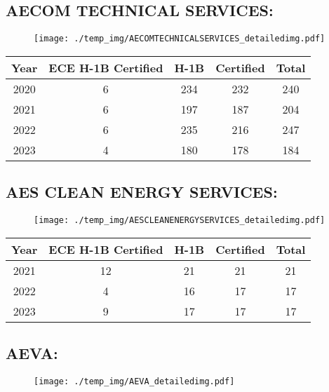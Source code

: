 \documentclass{article}%
\begin{document}
%
\newpage%
\subsection{AECOM TECHNICAL SERVICES:}%
\label{subsec:AECOMTECHNICALSERVICES}%
\label{AECOMTECHNICALSERVICESdetailed}%


\begin{figure}[htbp]%
\centering%
\texttt{[image: ./temp\_img/AECOMTECHNICALSERVICES\_detailedimg.pdf]}%
\end{figure}

%
\begin{longtable}{c|c|c|c|c}%
\hline%
Year&ECE H{-}1B Certified&H{-}1B&Certified&Total\\%
\hline%
2020&6&234&232&240\\%
\hline%
2021&6&197&187&204\\%
\hline%
2022&6&235&216&247\\%
\hline%
2023&4&180&178&184\\%
\hline%
\end{longtable}

%
\newpage%
\subsection{AES CLEAN ENERGY SERVICES:}%
\label{subsec:AESCLEANENERGYSERVICES}%
\label{AESCLEANENERGYSERVICESdetailed}%


\begin{figure}[htbp]%
\centering%
\texttt{[image: ./temp\_img/AESCLEANENERGYSERVICES\_detailedimg.pdf]}%
\end{figure}

%
\begin{longtable}{c|c|c|c|c}%
\hline%
Year&ECE H{-}1B Certified&H{-}1B&Certified&Total\\%
\hline%
2021&12&21&21&21\\%
\hline%
2022&4&16&17&17\\%
\hline%
2023&9&17&17&17\\%
\hline%
\end{longtable}

%
\newpage%
\subsection{AEVA:}%
\label{subsec:AEVA}%
\label{AEVAdetailed}%


\begin{figure}[htbp]%
\centering%
\texttt{[image: ./temp\_img/AEVA\_detailedimg.pdf]}%
\end{figure}
\end{document}
